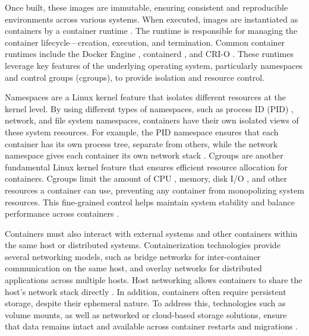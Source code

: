 Once built, these images are immutable, ensuring consistent and reproducible
environments across various systems. When executed, images are instantiated
as containers by a container runtime \cite{ContainerRuntimes}. The runtime is
responsible for managing the container lifecycle—creation, execution, and
termination. Common container runtimes include the Docker Engine
\cite{DockerEngine0200}, containerd \cite{Containerd}, and CRI-O
\cite{Crio2024}. These runtimes leverage key features of the underlying
operating system, particularly namespaces and control groups (cgroups), to
provide isolation and resource control.

Namespaces are a Linux kernel feature that isolates different resources at
the kernel level. By using different types of namespaces, such as process ID
(PID) \cite{ProcessIdentifier2024}, network, and file system namespaces,
containers have their own isolated views of these system resources. For
example, the PID namespace ensures that each container has its own process
tree, separate from others, while the network namespace gives each container
its own network stack \cite{LinuxNamespaces2024}. Cgroups are another
fundamental Linux kernel feature that ensures efficient resource allocation
for containers. Cgroups limit the amount of CPU \cite{CentralProcessingUnit2024},
memory, disk I/O \cite{InputOutput2024}, and other resources a
container can use, preventing any container from monopolizing system
resources. This fine-grained control helps maintain system stability and
balance performance across containers \cite{Cgroups2024}.

Containers must also interact with external systems and other containers
within the same host or distributed systems. Containerization technologies
provide several networking models, such as bridge networks for
inter-container communication on the same host, and overlay networks for
distributed applications across multiple hosts. Host networking allows
containers to share the host’s network stack directly \cite{Networking0200}.
In addition, containers often require persistent storage, despite their
ephemeral nature. To address this, technologies such as volume mounts, as
well as networked or cloud-based storage solutions, ensure that data remains
intact and available across container restarts and migrations
\cite{PersistingContainerData0200}.

